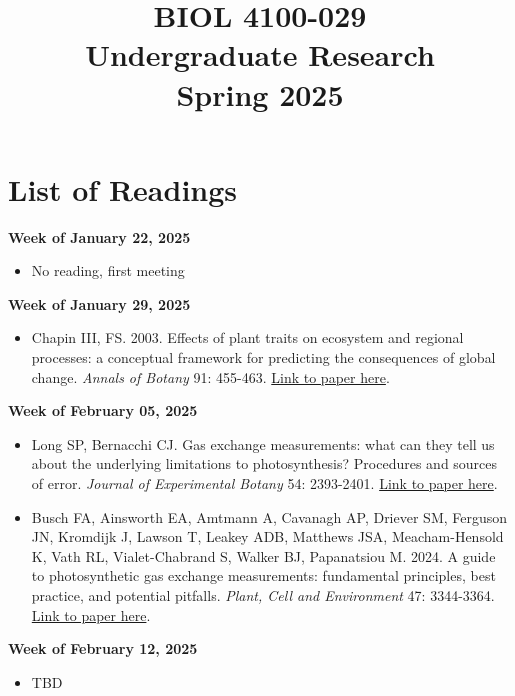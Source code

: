 \documentclass[12pt, notitlepage]{article}   	%
\title{
	\textbf{
		BIOL 4100-029
	} \\
	\large Undergraduate Research \\
	\large Spring 2025
}
\date{\vspace{-5ex}}
\begin{document}
{\selectfont %

\maketitle

\section{List of Readings}

\textbf{Week of January 22, 2025}
\begin{itemize}
    \item No reading, first meeting
\end{itemize}

\textbf{Week of January 29, 2025}

\begin{itemize}
    \item Chapin III, FS. 2003. Effects of plant traits on ecosystem and regional processes: a conceptual framework for predicting the consequences of global change. \textit{Annals of Botany} 91: 455-463. \href{https://academic.oup.com/aob/article-abstract/91/4/455/213070?redirectedFrom=fulltext}{Link to paper here}.
\end{itemize}

\textbf{Week of February 05, 2025}

\begin{itemize}
    \item Long SP, Bernacchi CJ. Gas exchange measurements: what can they tell us about the underlying limitations to photosynthesis? Procedures and sources of error. \textit{Journal of Experimental Botany} 54: 2393-2401. \href{https://academic.oup.com/jxb/article/54/392/2393/621914}{Link to paper here}.
    \item Busch FA, Ainsworth EA, Amtmann A, Cavanagh AP, Driever SM, Ferguson JN, Kromdijk J, Lawson T, Leakey ADB, Matthews JSA, Meacham-Hensold K, Vath RL, Vialet-Chabrand S, Walker BJ, Papanatsiou M. 2024. A guide to photosynthetic gas exchange measurements: fundamental principles, best practice, and potential pitfalls. \textit{Plant, Cell and Environment} 47: 3344-3364. \href{https://onlinelibrary.wiley.com/doi/full/10.1111/pce.14815}{Link to paper here}.
\end{itemize}

\textbf{Week of February 12, 2025}
\begin{itemize}
    \item TBD
\end{itemize}

}
\end{document}
